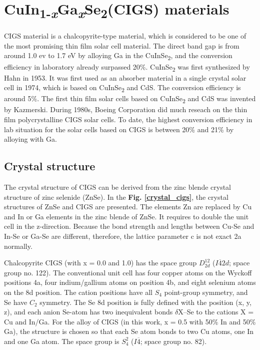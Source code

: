 \documentclass[a4paper, 12pt, titlepage,oneside,drop]{kthesis}
\begin{document}
\section{CuIn\textsubscript{1-\textit{x}}Ga\textsubscript{\textit{x}}Se\textsubscript{2}(CIGS) materials}
CIGS material is a chalcopyrite-type material, which is considered to be one of the most promising thin film solar cell material. The direct band gap is from around 1.0 ev to 1.7 eV by alloying Ga in the CuInSe\textsubscript{2},  and the conversion efficiency in laboratory already surpassed 20\%. 
CuInSe\textsubscript{2} was first synthesized by Hahn in 1953. It was first used as an absorber material in a single crystal solar cell in 1974, which is based on CuInSe\textsubscript{2} and CdS. The conversion efficiency is around 
5\%. The first thin film solar cells based on CuInSe\textsubscript{2} and CdS was invented by Kazmerski. During 1980s, Boeing Corporation did much reseach on the thin film polycrystalline CIGS solar cells. 
To date, the highest conversion efficiency in lab situation for the solar cells based on CIGS is between 20\% and 21\% by alloying with Ga.


\subsection{Crystal structure}
The crystal structure of CIGS can be derived from the zinc blende crystal structure of zinc selenide (ZnSe). In the \textbf{Fig. \ref{crystal_cigs}}, the crystal structures of ZnSe and CIGS are presented. 
The elements Zn are replaced by Cu and In or Ga elements in the zinc blende of ZnSe. It requires to double the unit cell in the z-direction. Because the bond strength and lengths between
Cu-Se and In-Se or Ga-Se are different, therefore, the lattice parameter c is not exact 2a normally.

Chalcopyrite CIGS (with x = 0.0 and 1.0) has the space group $D_{2d}^{12}$ ($I\overline{4}2d$; space group no. 122).
The conventional unit cell has four copper atoms on the Wyckoff positions 4a, four indium/gallium atoms on position 4b, and eight selenium atoms on the 8d position. 
The cation positions have all $S_4$ point-group symmetry, and Se have $C_2$ symmetry. 
The Se 8d position is fully defined with the position (x, y, z), and each anion Se-atom has two inequivalent bonds $\delta$X–Se to the cations X = Cu and In/Ga. 
For the alloy of CIGS (in this work, x = 0.5 with 50\% In and 50\% Ga), the structure is chosen so that each Se atom bonds to two Cu atoms, one In and one Ga atom. The space group is $S_{4}^{2}$ ($I\overline{4}$; space 
group no. 82).
\end{document}
